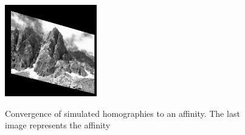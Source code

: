 \begin{figure}[h!]
{	{\includegraphics[width=40mm]{test_homo_conv9.png}}}\\
	\caption{Convergence of simulated homographies to an affinity. The last image represents the affinity}
	\label{image_converge_building}
\end{figure}
